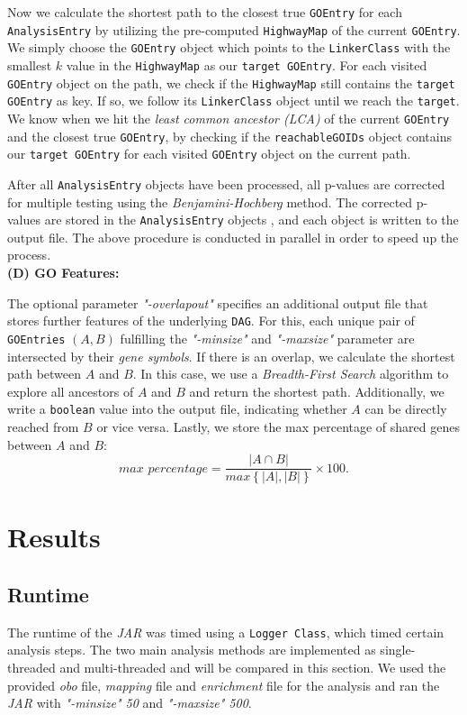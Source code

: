 \documentclass[12pt]{article}
\begin{document}
Now we calculate the shortest path to the closest true \texttt{GOEntry} for each \texttt{AnalysisEntry}
by utilizing the pre-computed \texttt{HighwayMap} of the current \texttt{GOEntry}.
We simply choose the \texttt{GOEntry} object which points to the \texttt{LinkerClass}
with the smallest $k$ value in the \texttt{HighwayMap} as our \texttt{target GOEntry}. 
For each visited \texttt{GOEntry} object on the path, we check
if the \texttt{HighwayMap} still contains the \texttt{target GOEntry} as key.
If so, we follow its \texttt{LinkerClass} object until we reach the \texttt{target}.
We know when we hit the \textit{least common ancestor (LCA)} of the current \texttt{GOEntry}
and the closest true \texttt{GOEntry},
by checking if the \texttt{reachableGOIDs} object contains our \texttt{target GOEntry}
for each visited \texttt{GOEntry} object on the current path.

After all \texttt{AnalysisEntry} objects have been processed, 
all p-values are corrected for multiple testing using the \textit{Benjamini-Hochberg}
method. The corrected p-values are stored in the \texttt{AnalysisEntry} objects
, and each object is written to the output file.
The above procedure is conducted in parallel in order to speed up the process.
\hspace{1mm}\\
\textbf{(D) GO Features:}

The optional parameter \textit{"-overlapout"} specifies an additional 
output file that stores further features of the underlying \texttt{DAG}.
For this, each unique pair of \texttt{GOEntries} $(A, B)$ fulfilling the
\textit{"-minsize"} and \textit{"-maxsize"} parameter are 
intersected by their \textit{gene symbols}. If there is an overlap,
we calculate the shortest path between $A$ and $B$.
In this case, we use a \textit{Breadth-First Search} algorithm
to explore all ancestors of $A$ and $B$ and return the shortest path.
Additionally, we write a \texttt{boolean} value into the output file, indicating whether $A$ can be directly reached from $B$ or vice versa.
Lastly, we store the max percentage of shared genes between $A$ and $B$:
\[
    \textit{max percentage} = \frac{|A \cap B|}{\textit{max}\left\{|A|, |B|\right\}} \times 100
.\]

\section{Results}
\subsection{Runtime}\label{sec:Runtime}
The runtime of the  \textit{JAR} was timed using a \texttt{Logger Class}, which 
timed certain analysis steps. The two main analysis methods are implemented as 
single-threaded and multi-threaded and will be compared in this section. We used the provided
\textit{obo} file, \textit{mapping} file and \textit{enrichment} file for the analysis and ran the \textit{JAR} with 
\textit{"-minsize" 50} and \textit{"-maxsize" 500}. 
\end{document}
